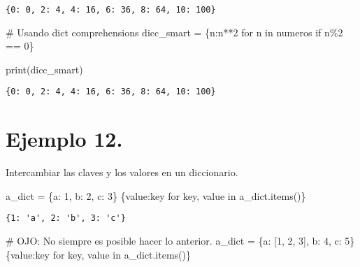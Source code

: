 \documentclass[
  letterpaper,
  DIV=11,
  numbers=noendperiod]{scrreprt}
\newenvironment{Shaded}{\begin{snugshade}}{\end{snugshade}}
\newcommand{\BuiltInTok}[1]{\textcolor[rgb]{0.00,0.23,0.31}{#1}}
\newcommand{\CommentTok}[1]{\textcolor[rgb]{0.37,0.37,0.37}{#1}}
\newcommand{\ControlFlowTok}[1]{\textcolor[rgb]{0.00,0.23,0.31}{#1}}
\newcommand{\DecValTok}[1]{\textcolor[rgb]{0.68,0.00,0.00}{#1}}
\newcommand{\KeywordTok}[1]{\textcolor[rgb]{0.00,0.23,0.31}{#1}}
\newcommand{\NormalTok}[1]{\textcolor[rgb]{0.00,0.23,0.31}{#1}}
\newcommand{\OperatorTok}[1]{\textcolor[rgb]{0.37,0.37,0.37}{#1}}
\newcommand{\StringTok}[1]{\textcolor[rgb]{0.13,0.47,0.30}{#1}}
\begin{document}
\begin{verbatim}
{0: 0, 2: 4, 4: 16, 6: 36, 8: 64, 10: 100}
\end{verbatim}

\begin{Shaded}
\begin{Highlighting}[]
\CommentTok{\# Usando dict comprehensions}
\NormalTok{dicc\_smart }\OperatorTok{=}\NormalTok{ \{n:n}\OperatorTok{**}\DecValTok{2} \ControlFlowTok{for}\NormalTok{ n }\KeywordTok{in}\NormalTok{ numeros }\ControlFlowTok{if}\NormalTok{ n}\OperatorTok{\%}\DecValTok{2} \OperatorTok{==} \DecValTok{0}\NormalTok{\}}

\BuiltInTok{print}\NormalTok{(dicc\_smart)}
\end{Highlighting}
\end{Shaded}

\begin{verbatim}
{0: 0, 2: 4, 4: 16, 6: 36, 8: 64, 10: 100}
\end{verbatim}

\section{\texorpdfstring{\textbf{Ejemplo
12.}}{Ejemplo 12.}}\label{ejemplo-12.-1}

Intercambiar las claves y los valores en un diccionario.

\begin{Shaded}
\begin{Highlighting}[]
\NormalTok{a\_dict }\OperatorTok{=}\NormalTok{ \{}\StringTok{\textquotesingle{}a\textquotesingle{}}\NormalTok{: }\DecValTok{1}\NormalTok{, }\StringTok{\textquotesingle{}b\textquotesingle{}}\NormalTok{: }\DecValTok{2}\NormalTok{, }\StringTok{\textquotesingle{}c\textquotesingle{}}\NormalTok{: }\DecValTok{3}\NormalTok{\}}
\NormalTok{\{value:key }\ControlFlowTok{for}\NormalTok{ key, value }\KeywordTok{in}\NormalTok{ a\_dict.items()\}}
\end{Highlighting}
\end{Shaded}

\begin{verbatim}
{1: 'a', 2: 'b', 3: 'c'}
\end{verbatim}

\begin{Shaded}
\begin{Highlighting}[]
\CommentTok{\# OJO: No siempre es posible hacer lo anterior.}
\NormalTok{a\_dict }\OperatorTok{=}\NormalTok{ \{}\StringTok{\textquotesingle{}a\textquotesingle{}}\NormalTok{: [}\DecValTok{1}\NormalTok{, }\DecValTok{2}\NormalTok{, }\DecValTok{3}\NormalTok{], }\StringTok{\textquotesingle{}b\textquotesingle{}}\NormalTok{: }\DecValTok{4}\NormalTok{, }\StringTok{\textquotesingle{}c\textquotesingle{}}\NormalTok{: }\DecValTok{5}\NormalTok{\}}
\NormalTok{\{value:key }\ControlFlowTok{for}\NormalTok{ key, value }\KeywordTok{in}\NormalTok{ a\_dict.items()\}}
\end{Highlighting}
\end{Shaded}
\end{document}
